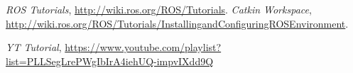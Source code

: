 \begin{thebibliography}{99}
    
 \textit{ROS Tutorials}, \url{http://wiki.ros.org/ROS/Tutorials}.
 \textit{Catkin Workspace}, \url{http://wiki.ros.org/ROS/Tutorials/InstallingandConfiguringROSEnvironment}.

 \textit{YT Tutorial}, \url{https://www.youtube.com/playlist?list=PLLSegLrePWgIbIrA4iehUQ-impvIXdd9Q}
    
\end{thebibliography}